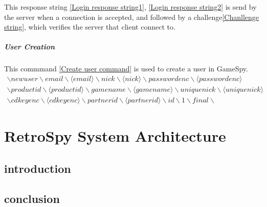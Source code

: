 \documentclass[oneside,titlepage,a4paper]{report} %
\begin{document}
This response string \ref{Login response string1}, \ref{Login response string2} is send by the server when a connection is accepted, and followed by a challenge\ref{Chanllenge string}, which verifies the server that client connect to.



\subsubsection{User Creation}
This commmand \ref{Create user command} is used to create a user in GameSpy.
\begin{equation}\label{Create user command}
\begin{gathered}
\backslash newuser \backslash email \backslash \langle email \rangle \backslash nick \backslash \langle nick \rangle \backslash passwordenc \backslash \langle passwordenc \rangle \\
\backslash productid \backslash \langle productid \rangle \backslash gamename \backslash \langle gamename \rangle \backslash uniquenick \backslash \langle uniquenick \rangle \\ \backslash cdkeyenc \backslash \langle cdkeyenc \rangle \backslash partnerid \backslash \langle partnerid \rangle \backslash id \backslash 1 \backslash final \backslash
\end{gathered}	
\end{equation}


\part{RetroSpy System Architecture}


\chapter{introduction}

\chapter{conclusion}
\end{document}
